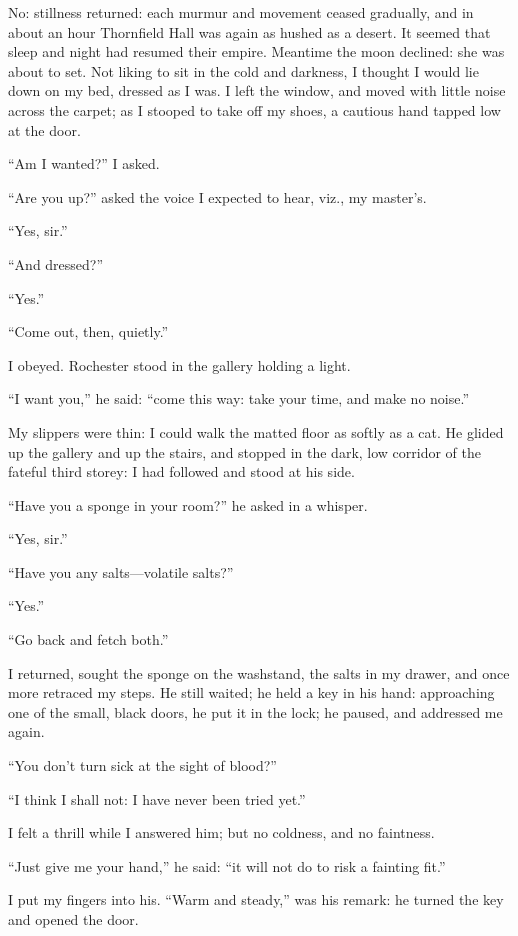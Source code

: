 No: stillness returned: each murmur and movement ceased gradually, and
in about an hour Thornfield Hall was again as hushed as a desert. It
seemed that sleep and night had resumed their empire. Meantime the moon
declined: she was about to set. Not liking to sit in the cold and
darkness, I thought I would lie down on my bed, dressed as I was. I
left the window, and moved with little noise across the carpet; as I
stooped to take off my shoes, a cautious hand tapped low at the door.

\enquote{Am I wanted?} I asked.

\enquote{Are you up?} asked the voice I expected to hear, viz., my
master's.

\enquote{Yes, sir.}

\enquote{And dressed?}

\enquote{Yes.}

\enquote{Come out, then, quietly.}

I obeyed. \Mr{} Rochester stood in the gallery holding a light.

\enquote{I want you,} he said: \enquote{come this way: take your time,
	and make no noise.}

My slippers were thin: I could walk the matted floor as softly as a
cat. He glided up the gallery and up the stairs, and stopped in the
dark, low corridor of the fateful third storey: I had followed and stood
at his side.

\enquote{Have you a sponge in your room?} he asked in a whisper.

\enquote{Yes, sir.}

\enquote{Have you any salts---volatile salts?}

\enquote{Yes.}

\enquote{Go back and fetch both.}

I returned, sought the sponge on the washstand, the salts in my drawer,
and once more retraced my steps. He still waited; he held a key in his
hand: approaching one of the small, black doors, he put it in the lock;
he paused, and addressed me again.

\enquote{You don't turn sick at the sight of blood?}

\enquote{I think I shall not: I have never been tried yet.}

I felt a thrill while I answered him; but no coldness, and no faintness.

\enquote{Just give me your hand,} he said: \enquote{it will not do to
	risk a fainting fit.}

I put my fingers into his. \enquote{Warm and steady,} was his remark:
he turned the key and opened the door.

